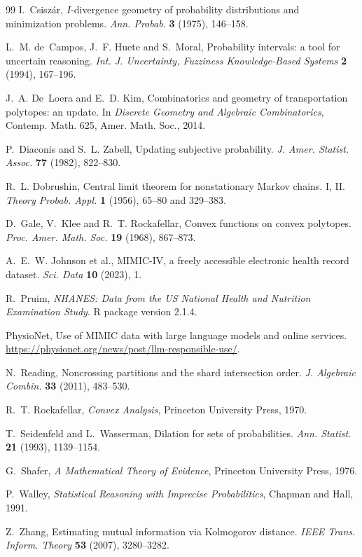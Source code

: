 \documentclass[11pt]{article}
\theoremstyle{definition}
\theoremstyle{remark}
\begin{document}
\begin{thebibliography}{99}
I.~Csiszár, {$I$}-divergence geometry of probability distributions and minimization problems. \emph{Ann. Probab.} \textbf{3}
(1975), 146--158.

L.~M. de~Campos, J.~F. Huete and S.~Moral, Probability intervals: a tool for uncertain reasoning. \emph{Int. J. Uncertainty,
Fuzziness Knowledge-Based Systems} \textbf{2} (1994), 167--196.

J.~A. De~Loera and E.~D. Kim, Combinatorics and geometry of transportation polytopes: an update. In \emph{Discrete Geometry and
Algebraic Combinatorics}, Contemp. Math. 625, Amer. Math. Soc., 2014.

P.~Diaconis and S.~L. Zabell, Updating subjective probability. \emph{J. Amer. Statist. Assoc.} \textbf{77} (1982), 822--830.

R.~L. Dobrushin, Central limit theorem for nonstationary {M}arkov chains. {I}, {II}. \emph{Theory Probab. Appl.} \textbf{1} (1956),
65--80 and 329--383.

D.~Gale, V.~Klee and R.~T. Rockafellar, Convex functions on convex polytopes. \emph{Proc. Amer. Math. Soc.} \textbf{19} (1968), 867--873.

A.~E.~W. Johnson et al., {MIMIC-IV}, a freely accessible electronic health record dataset. \emph{Sci. Data} \textbf{10} (2023), 1.

R.~Pruim, \emph{NHANES: Data from the US National Health and Nutrition Examination Study}. R package version 2.1.4.

PhysioNet, Use of {MIMIC} data with large language models and online services.
\url{https://physionet.org/news/post/llm-responsible-use/}.

N.~Reading, Noncrossing partitions and the shard intersection order. \emph{J. Algebraic Combin.} \textbf{33} (2011), 483--530.

R.~T. Rockafellar, \emph{Convex Analysis}, Princeton University Press, 1970.

T.~Seidenfeld and L.~Wasserman, Dilation for sets of probabilities. \emph{Ann. Statist.} \textbf{21} (1993), 1139--1154.

G.~Shafer, \emph{A Mathematical Theory of Evidence}, Princeton University Press, 1976.

P.~Walley, \emph{Statistical Reasoning with Imprecise Probabilities}, Chapman and Hall, 1991.

Z.~Zhang, Estimating mutual information via {K}olmogorov distance. \emph{IEEE Trans. Inform. Theory} \textbf{53} (2007), 3280--3282.

\end{thebibliography}
\end{document}
